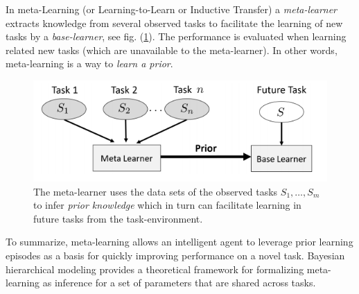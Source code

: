 In meta-Learning (or Learning-to-Learn or Inductive Transfer) a \textit{meta-learner} extracts knowledge from several observed tasks to facilitate the learning of new tasks by a \textit{base-learner}, see fig. (\ref{fig:meta_learning}). 
The performance is evaluated when learning related new tasks (which are unavailable to the meta-learner). In other words, meta-learning is a way to \textit{learn a prior}. 
\begin{figure}
    \centering
    \includegraphics[scale=0.5]{images/meta.png}
    \caption{The meta-learner uses the data sets of the observed tasks $S_1, \dots, S_m$ to infer \textit{prior knowledge} which in turn can facilitate learning in future tasks from the task-environment.}\label{fig:meta_learning}
\end{figure}

To summarize, meta-learning allows an intelligent agent to leverage prior learning episodes as a basis for quickly improving performance on a novel task. Bayesian hierarchical modeling provides a theoretical framework for formalizing meta-learning as inference for a set of parameters that are shared across tasks.


